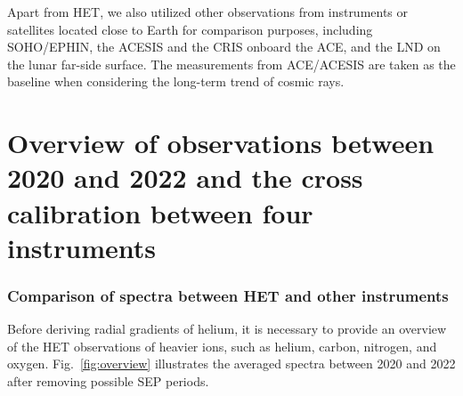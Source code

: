 

Apart from \ac{HET}, we also utilized other observations from instruments or satellites located close to Earth for comparison purposes, including \ac{SOHO}/\ac{EPHIN}, the \ac{ACESIS} and the \acs{CRIS} onboard the \acs{ACE}, and the \acs{LND} on the lunar far-side surface. The measurements from \ac{ACE}/\ac{ACESIS} are taken as the baseline when considering the long-term trend of cosmic rays. 

\section{Overview of observations between 2020 and 2022 and the cross calibration between four instruments}

\subsubsection*{Comparison of spectra between \ac{HET} and other instruments}
Before deriving radial gradients of helium, it is necessary to provide an overview of the \ac{HET} observations of heavier ions, such as helium, carbon, nitrogen, and oxygen. Fig.~\ref{fig:overview} illustrates the averaged spectra between 2020 and 2022 after removing possible \ac{SEP} periods.


